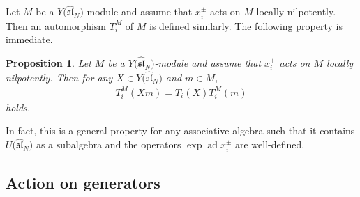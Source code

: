 \documentclass[pdftex]{sigma}
\newtheorem{prop}[thm]{Proposition}
\theoremstyle{definition}
\numberwithin{equation}{section}
\DeclareMathOperator{\ad}{ad}
\newcommand{\affY}{Y\big(\affsl\big)}
\newcommand{\affsl}{\hat{\mathfrak{sl}}_N}
\begin{document}
Let $M$ be a $\affY$-module and assume that $x_i^{\pm}$ acts on $M$ locally nilpotently. Then an automorphism $T_i^M$ of $M$ is defined similarly. The following property is immediate.
\begin{prop}Let $M$ be a $\affY$-module and assume that $x_i^{\pm}$ acts on $M$ locally nilpotently. Then for any $X \in \affY$ and $m \in M$,
\begin{gather*}
T_i^M(Xm)=T_i(X)T_i^M(m)
\end{gather*}
holds.
\end{prop}

In fact, this is a general property for any associative algebra such that it contains $U\big(\affsl\big)$ as a subalgebra and the operators $\exp\ad x_i^{\pm}$ are well-defined.

\subsection{Action on generators}
\end{document}
